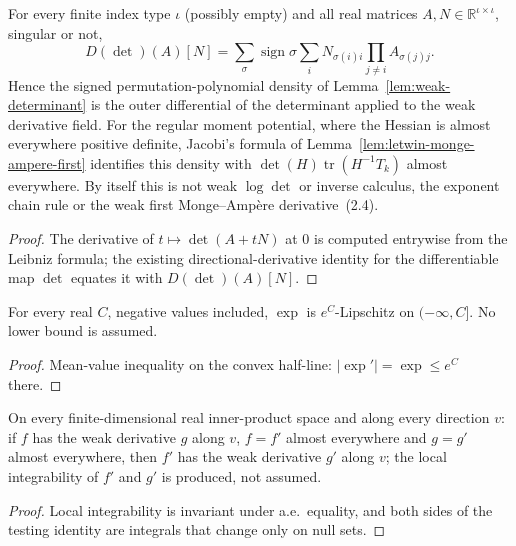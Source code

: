 \begin{lemma}
  \label{lem:determinant-permutation-differential}
  \leanok
  For every finite index type $\iota$ (possibly empty) and all real matrices $A,N\in\mathbb R^{\iota\times\iota}$, singular or not,
  \[
    D(\det)(A)[N]=\sum_{\sigma}\operatorname{sign}\sigma\sum_{i}N_{\sigma(i)i}\prod_{j\ne i}A_{\sigma(j)j}.
  \]
  Hence the signed permutation-polynomial density of Lemma~\ref{lem:weak-determinant} is the outer differential of the determinant
  applied to the weak derivative field. For the regular moment potential, where the Hessian is almost
  everywhere positive definite, Jacobi's formula of Lemma~\ref{lem:letwin-monge-ampere-first} identifies this density with
  $\det(H)\operatorname{tr}(H^{-1}T_k)$ almost everywhere. By itself this is not weak $\log\det$ or inverse calculus, the exponent chain rule or
  the weak first Monge--Amp\`ere derivative~(2.4).
\end{lemma}
\begin{proof}
  \leanok
  The derivative of $t\mapsto\det(A+tN)$ at $0$ is computed entrywise from the Leibniz formula; the existing directional-derivative
  identity for the differentiable map $\det$ equates it with $D(\det)(A)[N]$.
\end{proof}

\begin{lemma}
  \label{lem:exp-lipschitz-half-line}
  \leanok
  For every real $C$, negative values included, $\exp$ is $e^{C}$-Lipschitz on $(-\infty,C]$. No lower bound is assumed.
\end{lemma}
\begin{proof}
  \leanok
  Mean-value inequality on the convex half-line: $|\exp'|=\exp\le e^{C}$ there.
\end{proof}

\begin{lemma}
  \label{lem:weak-derivative-ae-congr}
  \leanok
  On every finite-dimensional real inner-product space and along every direction $v$: if $f$ has the weak derivative $g$ along $v$,
  $f=f'$ almost everywhere and $g=g'$ almost everywhere, then $f'$ has the weak derivative $g'$ along $v$; the local integrability of
  $f'$ and $g'$ is produced, not assumed.
\end{lemma}
\begin{proof}
  \leanok
  Local integrability is invariant under a.e.\ equality, and both sides of the testing identity are integrals that change only on null
  sets.
\end{proof}

